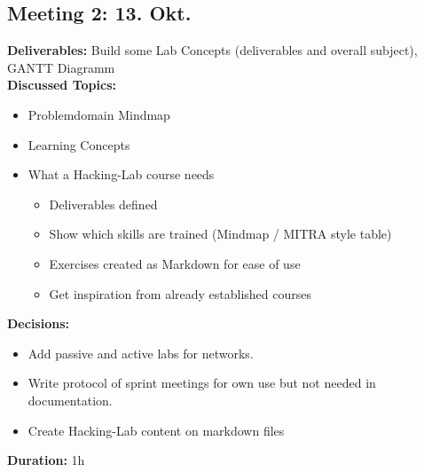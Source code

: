 \subsection*{Meeting 2: 13. Okt.}
\textbf{Deliverables:} Build some Lab Concepts (deliverables and overall subject), GANTT Diagramm \\
\textbf{Discussed Topics:} 
\begin{itemize}
    \item Problemdomain Mindmap
    \item Learning Concepts
    \item What a Hacking-Lab course needs
    \begin{itemize}
        \item Deliverables defined
        \item Show which skills are trained (Mindmap / MITRA style table)
        \item Exercises created as Markdown for ease of use 
        \item Get inspiration from already established courses
    \end{itemize}
\end{itemize}
\textbf{Decisions:} 
\begin{itemize}
    \item Add passive and active labs for networks.
    \item Write protocol of sprint meetings for own use but not needed in documentation.
    \item Create Hacking-Lab content on markdown files
\end{itemize} 
\textbf{Duration:} 1h

\newpage

